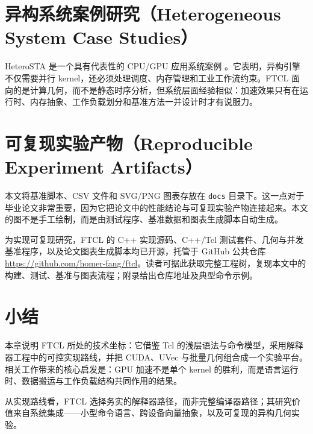 \section{异构系统案例研究（Heterogeneous System Case Studies）}
HeteroSTA 是一个具有代表性的 CPU/GPU 应用系统案例 \cite{guo2026heterosta}。它表明，异构引擎不仅需要并行 kernel，还必须处理调度、内存管理和工业工作流约束。FTCL 面向的是计算几何，而不是静态时序分析，但系统层面经验相似：加速效果只有在运行时、内存抽象、工作负载划分和基准方法一并设计时才有说服力。

\section{可复现实验产物（Reproducible Experiment Artifacts）}
本文将基准脚本、CSV 文件和 SVG/PNG 图表存放在 \texttt{docs} 目录下。这一点对于毕业论文非常重要，因为它把论文中的性能结论与可复现实验产物连接起来。本文的图不是手工绘制，而是由测试程序、基准数据和图表生成脚本自动生成。

为实现可复现研究，FTCL 的 C++ 实现源码、C++/Tcl 测试套件、几何与并发基准程序，以及论文图表生成脚本均已开源，托管于 GitHub 公共仓库 \url{https://github.com/homer-fang/ftcl}。读者可据此获取完整工程树，复现本文中的构建、测试、基准与图表流程；附录给出仓库地址及典型命令示例。

\section{小结}
本章说明 FTCL 所处的技术坐标：它借鉴 Tcl 的浅层语法与命令模型，采用解释器工程中的可控实现路线，并把 CUDA、UVec 与批量几何组合成一个实验平台。相关工作带来的核心启发是：GPU 加速不是单个 kernel 的胜利，而是语言运行时、数据搬运与工作负载结构共同作用的结果。

从实现路线看，FTCL 选择务实的解释器路径，而非完整编译器路径；其研究价值来自系统集成——小型命令语言、跨设备向量抽象，以及可复现的异构几何\mbox{实验}。
